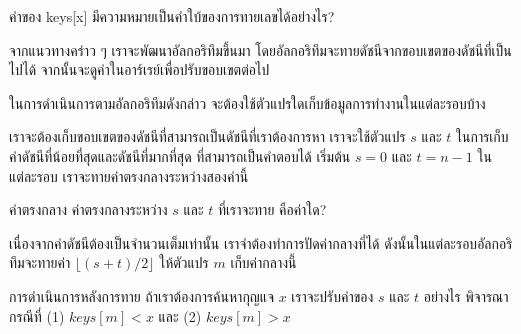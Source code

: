 \begin{quiz}{}
ค่า{\wbr}ของ {\ct keys[x]} มี{\wbr}ความหมาย{\wbr}เป็น{\wbr}คำ{\wbr}ใบ้{\wbr}ของ{\wbr}การ{\wbr}ทาย{\wbr}เลข{\wbr}ได้{\wbr}อย่างไร?
\end{quiz}

จาก{\wbr}แนวทาง{\wbr}คร่าว ๆ เรา{\wbr}จะ{\wbr}พัฒนา{\wbr}อัล{\wbr}กอ{\wbr}ริ{\wbr}ทึม{\wbr}ขึ้น{\wbr}มา{\wbr}
โดย{\wbr}อัล{\wbr}กอ{\wbr}ริ{\wbr}ทึม{\wbr}จะ{\wbr}ทาย{\wbr}ดัชนี{\wbr}จาก{\wbr}ขอบเขต{\wbr}ของ{\wbr}ดัชนี{\wbr}ที่{\wbr}เป็น{\wbr}ไป{\wbr}ได้{\wbr}
จากนั้น{\wbr}จะ{\wbr}ดู{\wbr}ค่า{\wbr}ใน{\wbr}อาร์เรย์{\wbr}เพื่อ{\wbr}ปรับ{\wbr}ขอบเขต{\wbr}ต่อไป{\wbr}

\begin{quiz}{}
ใน{\wbr}การ{\wbr}ดำเนินการ{\wbr}ตาม{\wbr}อัล{\wbr}กอ{\wbr}ริ{\wbr}ทึม{\wbr}ดังกล่าว จะ{\wbr}ต้อง{\wbr}ใช้{\wbr}ตัวแปร{\wbr}ใด{\wbr}เก็บ{\wbr}ข้อมูล{\wbr}การ{\wbr}ทำงาน{\wbr}ใน{\wbr}แต่ละ{\wbr}รอบ{\wbr}บ้าง{\wbr}
\end{quiz}

เรา{\wbr}จะ{\wbr}ต้อง{\wbr}เก็บ{\wbr}ขอบเขต{\wbr}ของ{\wbr}ดัชนี{\wbr}ที่{\wbr}สามารถ{\wbr}เป็น{\wbr}ดัชนี{\wbr}ที่{\wbr}เรา{\wbr}ต้องการ{\wbr}หา เรา{\wbr}จะ{\wbr}ใช้{\wbr}ตัวแปร $s$
และ $t$ ใน{\wbr}การ{\wbr}เก็บ{\wbr}ค่า{\wbr}ดัชนี{\wbr}ที่{\wbr}น้อย{\wbr}ที่สุด{\wbr}และ{\wbr}ดัชนี{\wbr}ที่{\wbr}มาก{\wbr}ที่สุด ที่{\wbr}สามารถ{\wbr}เป็น{\wbr}คำตอบ{\wbr}ได้ เริ่มต้น{\wbr}
$s=0$ และ $t=n-1$ ใน{\wbr}แต่ละ{\wbr}รอบ เรา{\wbr}จะ{\wbr}ทาย{\wbr}ค่า{\wbr}ตรง{\wbr}กลาง{\wbr}ระหว่าง{\wbr}สอง{\wbr}ค่า{\wbr}นี้{\wbr}

\begin{quiz}{ค่า{\wbr}ตรง{\wbr}กลาง}
ค่า{\wbr}ตรง{\wbr}กลาง{\wbr}ระหว่าง $s$ และ $t$ ที่{\wbr}เรา{\wbr}จะ{\wbr}ทาย คือ{\wbr}ค่า{\wbr}ใด?
\end{quiz}

เนื่องจาก{\wbr}ค่า{\wbr}ดัชนี{\wbr}ต้อง{\wbr}เป็น{\wbr}จำนวนเต็ม{\wbr}เท่านั้น เรา{\wbr}จำ{\wbr}ต้อง{\wbr}ทำ{\wbr}การ{\wbr}ปัด{\wbr}ค่า{\wbr}กลาง{\wbr}ที่{\wbr}ได้{\wbr}
ดังนั้น{\wbr}ใน{\wbr}แต่ละ{\wbr}รอบ{\wbr}อัล{\wbr}กอ{\wbr}ริ{\wbr}ทึม{\wbr}จะ{\wbr}ทาย{\wbr}ค่า $\lfloor (s+t)/2 \rfloor$ ให้{\wbr}ตัวแปร $m$
เก็บ{\wbr}ค่า{\wbr}กลาง{\wbr}นี้{\wbr}

\begin{quiz}{การ{\wbr}ดำเนินการ{\wbr}หลัง{\wbr}การ{\wbr}ทาย}
ถ้า{\wbr}เรา{\wbr}ต้องการ{\wbr}ค้นหา{\wbr}กุญแจ $x$ เรา{\wbr}จะ{\wbr}ปรับ{\wbr}ค่า{\wbr}ของ $s$ และ $t$ อย่างไร พิจารณา{\wbr}กรณี{\wbr}ที่ (1)
$keys[m] < x$ และ (2) $keys[m] > x$
\end{quiz}

